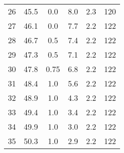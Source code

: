 \begin{table}
\begin{tabular}{c c c c c c}
26 & 45.5 & 0.0	 & 8.0  & 2.3	& 120 \\
27 & 46.1 & 0.0	 & 7.7  & 2.2	& 122 \\
28 & 46.7 & 0.5	 & 7.4  & 2.2	& 122 \\
29 & 47.3 & 0.5	 & 7.1  & 2.2	& 122 \\
30 & 47.8 & 0.75 & 6.8  & 2.2	& 122 \\
31 & 48.4 & 1.0	 & 5.6  & 2.2	& 122 \\
32 & 48.9 & 1.0	 & 4.3  & 2.2	& 122 \\
33 & 49.4 & 1.0	 & 3.4  & 2.2	& 122 \\
34 & 49.9 & 1.0	 & 3.0  & 2.2	& 122 \\
35 & 50.3 & 1.0	 & 2.9  & 2.2	& 122 \\
\bottomrule
\end{tabular}
\end{table}
